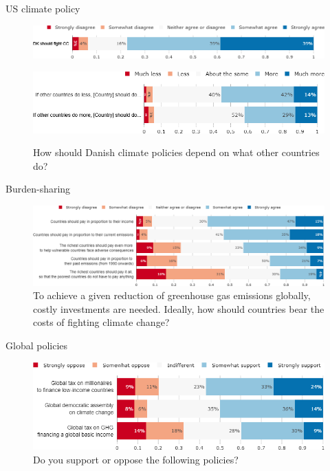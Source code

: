 \documentclass[aspectratio=169,9pt,dvipsnames]{beamer}
\begin{document}
\begin{frame}{US climate policy}%
\begin{figure}[h!]
\centering
\caption{Do you agree or disagree with the following statement: ``Denmark should take measures to fight climate change."}
\includegraphics[width=1\textwidth]{../figures/DK/should_fight_CC_DK.png} \\
\vspace{1cm}
\caption{How should Danish climate policies depend on what other countries do?}
\includegraphics[width=1\textwidth]{../figures/DK/if_other_do_DK.png} \\
\end{figure}
\end{frame}


\begin{frame}{Burden-sharing}%
\begin{figure}[h!]
\centering
\caption{To achieve a given reduction of greenhouse gas emissions globally, costly investments are needed.
Ideally, how should countries bear the costs of fighting climate change?}
\vspace{2mm}
\includegraphics[width=\textwidth]{../figures/DK/burden_sharing_DK.png}
\end{figure}
\end{frame}

\begin{frame}{Global policies}%
\begin{figure}[h!]
\centering
\caption{Do you support or oppose the following policies?}
\vspace{2mm}
\includegraphics[width=\textwidth]{../figures/DK/global_policies_DK.png}
\end{figure}
\end{frame}
\end{document}
